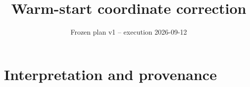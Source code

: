 \documentclass[10pt]{article}
\title{Warm-start coordinate correction}
\author{Frozen plan v1 -- execution 2026-09-12}
\date{}
\begin{document}
\maketitle


\clearpage
\section*{Interpretation and provenance}

\par\medskip

\small
\end{document}
